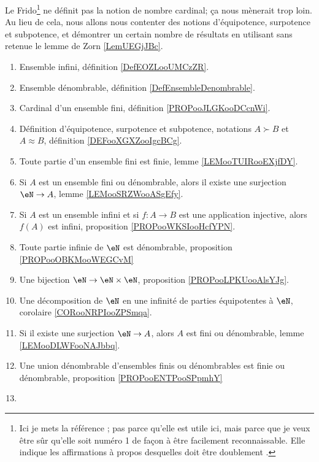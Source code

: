 	\label{THEMEooCardinalite}
Le Frido\footnote{Ici je mets la référence \cite{MonCerveau}; pas parce qu'elle est utile ici, mais parce que je veux être sûr qu'elle soit numéro 1 de façon à être facilement reconnaissable. Elle indique les affirmations à propos desquelles  doit être doublement .} ne définit pas la notion de nombre cardinal; ça nous mènerait trop loin. Au lieu de cela, nous allons nous contenter des notions d'équipotence, surpotence et subpotence, et démontrer un certain nombre de résultats en utilisant sans retenue le lemme de Zorn \ref{LemUEGjJBc}.
\begin{enumerate}
	\item
	      Ensemble infini, définition \ref{DefEOZLooUMCzZR}.
	\item
	      Ensemble dénombrable, définition \ref{DefEnsembleDenombrable}.
	\item
	      Cardinal d'un ensemble fini, définition \ref{PROPooJLGKooDCcnWi}.
	\item
	      Définition d'équipotence, surpotence et subpotence, notations \( A\succ B\) et \( A\approx B\), définition \ref{DEFooXGXZooIgcBCg}.
	\item
	      Toute partie d'un ensemble fini est finie, lemme \ref{LEMooTUIRooEXjfDY}.
	\item
	      Si \( A\) est un ensemble fini ou dénombrable, alors il existe une surjection \( \eN\to A\), lemme \ref{LEMooSRZWooASgEfy}.
	\item
	      Si \( A\) est un ensemble infini et si \( f\colon A\to B\) est une application injective, alors \( f(A)\) est infini, proposition \ref{PROPooWKSIooHcfYPN}.
	\item
	      Toute partie infinie de \( \eN\) est dénombrable, proposition \ref{PROPooOBKMooWEGCvM}
	\item
	      Une bijection \( \eN\to \eN\times \eN\), proposition \ref{PROPooLPKUooAlsYJg}.
	\item
	      Une décomposition de \( \eN\) en une infinité de parties équipotentes à \( \eN\), corolaire \ref{CORooNRPIooZPSmqa}.
	\item
	      Si il existe une surjection \( \eN\to A\), alors \( A\) est fini ou dénombrable, lemme \ref{LEMooDLWFooNAJbbq}.
	\item
	      Une union dénombrable d'ensembles finis ou dénombrables est finie ou dénombrable, proposition \ref{PROPooENTPooSPpmhY}
	\item

\end{enumerate}
